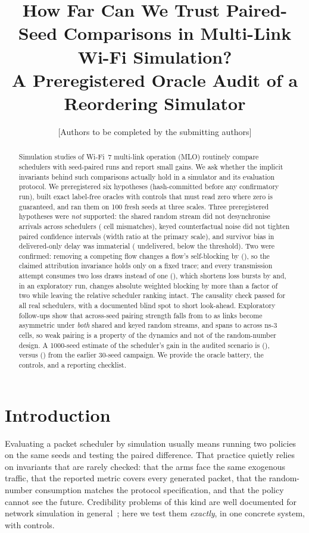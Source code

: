 \documentclass[11pt]{article}
\title{How Far Can We Trust Paired-Seed Comparisons in Multi-Link Wi-Fi Simulation?\\
A Preregistered Oracle Audit of a Reordering Simulator}
\author{[Authors to be completed by the submitting authors]}
\date{}
\begin{document}
\maketitle

\begin{abstract}
Simulation studies of Wi-Fi~7 multi-link operation (MLO) routinely compare schedulers with seed-paired runs and report small gains.
We ask whether the implicit invariants behind such comparisons actually hold in a simulator and its evaluation protocol.
We preregistered six hypotheses (hash-committed before any confirmatory run), built exact label-free oracles with controls that must read zero where zero is guaranteed, and ran them on 100 fresh seeds at three scales.
Three preregistered hypotheses were \emph{not} supported: the shared random stream did not desynchronise arrivals across schedulers (\OneMismatchShared{} cell mismatches), keyed counterfactual noise did not tighten paired confidence intervals (width ratio \WidthRatioTwo{} at the primary scale), and survivor bias in delivered-only delay was immaterial (\UndelFracFIFO{} undelivered, below the \UndelThreshold{} threshold).
Two were confirmed: removing a competing flow changes a flow's self-blocking by \HFourRatioFIFO{} (\HFourRatioFIFOCI{}), so the claimed attribution invariance holds only on a fixed trace; and every transmission attempt consumes two loss draws instead of one (\OFiveRate{}), which shortens loss bursts by \BurstRelAbs{} and, in an exploratory run, changes absolute weighted blocking by more than a factor of two while leaving the relative scheduler ranking intact. The causality check passed for all real schedulers, with a documented blind spot to short look-ahead.
Exploratory follow-ups show that across-seed pairing strength falls from \XOneRhoLow{} to \XOneRhoHigh{} as links become asymmetric under \emph{both} shared and keyed random streams, and spans \XFiveRhoMin{} to \XFiveRhoMax{} across ns-3 cells, so weak pairing is a property of the dynamics and not of the random-number design.
A 1000-seed estimate of the scheduler's gain in the audited scenario is \XFourDShared{} (\XFourCIShared{}), versus \OldD{} (\OldDCI{}) from the earlier 30-seed campaign.
We provide the oracle battery, the controls, and a reporting checklist.
\end{abstract}

\section{Introduction}
Evaluating a packet scheduler by simulation usually means running two policies on the same seeds and testing the paired difference.
That practice quietly relies on invariants that are rarely checked: that the arms face the same exogenous traffic, that the reported metric covers every generated packet, that the random-number consumption matches the protocol specification, and that the policy cannot see the future.
Credibility problems of this kind are well documented for network simulation in general~\cite{kurkowski2005manet}; here we test them \emph{exactly}, in one concrete system, with controls.
\end{document}
